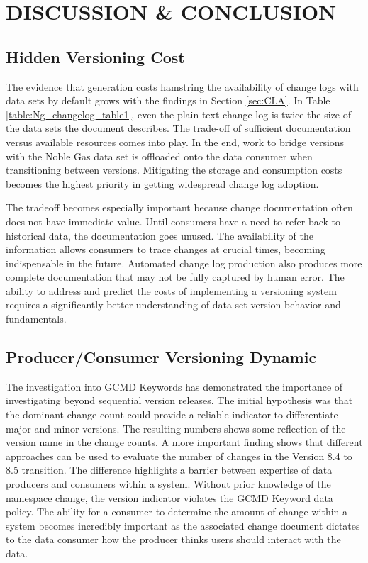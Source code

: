 \chapter{DISCUSSION \& CONCLUSION}

\section{Hidden Versioning Cost}

The evidence that generation costs hamstring the availability of change logs with data sets by default grows with the findings in Section \ref{sec:CLA}.
In Table \ref{table:Ng_changelog_table1}, even the plain text change log is twice the size of the data sets the document describes.
The trade-off of sufficient documentation versus available resources comes into play.
In the end, work to bridge versions with the Noble Gas data set is offloaded onto the data consumer when transitioning between versions.
Mitigating the storage and consumption costs becomes the highest priority in getting widespread change log adoption.

The tradeoff becomes especially important because change documentation often does not have immediate value.
Until consumers have a need to refer back to historical data, the documentation goes unused.
The availability of the information allows consumers to trace changes at crucial times, becoming indispensable in the future.
Automated change log production also produces more complete documentation that may not be fully captured by human error.
The ability to address and predict the costs of implementing a versioning system requires a significantly better understanding of data set version behavior and fundamentals. 

\section{Producer/Consumer Versioning Dynamic}

The investigation into GCMD Keywords has demonstrated the importance of investigating beyond sequential version releases.  
The initial hypothesis was that the dominant change count could provide a reliable indicator to differentiate major and minor versions.  
The resulting numbers shows some reflection of the version name in the change counts.  
A more important finding shows that different approaches can be used to evaluate the number of changes in the Version 8.4 to 8.5 transition.  
The difference highlights a barrier between expertise of data producers and consumers within a system.  
Without prior knowledge of the namespace change, the version indicator violates the GCMD Keyword data policy.  
The ability for a consumer to determine the amount of change within a system becomes incredibly important as the associated change document dictates to the data consumer how the producer thinks users should interact with the data.

